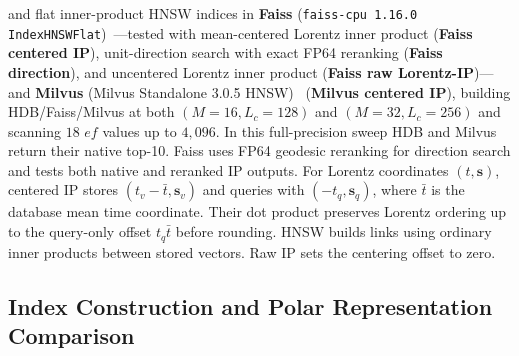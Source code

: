 and flat inner-product {HNSW} indices in \textbf{Faiss} (\texttt{faiss-cpu 1.16.0} \texttt{IndexHNSWFlat})~\cite{douze2024faiss}---tested with mean-centered {Lorentz} inner product (\textbf{Faiss centered IP}), unit-direction search with exact FP64 reranking (\textbf{Faiss direction}), and uncentered {Lorentz} inner product (\textbf{Faiss raw Lorentz-IP})---and \textbf{Milvus} ({Milvus Standalone 3.0.5} {HNSW})~\cite{wang2021milvus} (\textbf{Milvus centered IP}), building {HDB}/{Faiss}/{Milvus} at both $(M=16, L_c=128)$ and $(M=32, L_c=256)$ and scanning $18$ $ef$ values up to $4{,}096$. In this full-precision sweep HDB and Milvus return their native top-10. Faiss uses FP64 geodesic reranking for direction search and tests both native and reranked IP outputs. For Lorentz coordinates $(t,\mathbf{s})$, centered IP stores $(t_v-\bar t,\mathbf{s}_v)$ and queries with $(-t_q,\mathbf{s}_q)$, where $\bar t$ is the database mean time coordinate. Their dot product preserves Lorentz ordering up to the query-only offset $t_q\bar t$ before rounding. HNSW builds links using ordinary inner products between stored vectors. Raw IP sets the centering offset to zero.

\subsection{Index Construction and Polar Representation Comparison}
\label{subsec:eval_repr}

